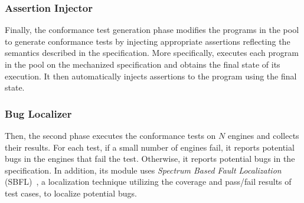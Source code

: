 \subsubsection{Assertion Injector}
Finally, the conformance test generation phase modifies the programs in the pool to generate
conformance tests by injecting appropriate assertions reflecting the
semantics described in the specification.  More specifically,
 executes each program in the pool on the mechanized
specification and obtains the final state of its execution.  It then
automatically injects assertions to the program using the final state.

\subsubsection{Bug Localizer}
Then, the second phase executes the conformance tests on $N$ engines and
collects their results.  For each test, if a small number of engines fail,
it reports potential bugs in the engines that fail the test.
Otherwise, it reports potential bugs in the specification.
In addition, its  module uses \textit{Spectrum
Based Fault Localization} (SBFL)~\cite{sbfl-survey}, a localization
technique utilizing the coverage and pass/fail results of test cases, to
localize potential bugs.

